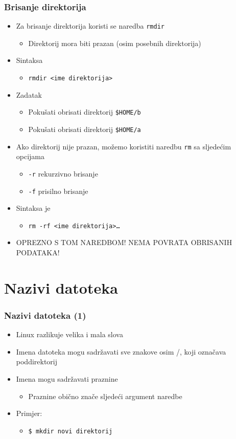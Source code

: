 \documentclass{beamer}
\begin{document}
\begin{frame}[t]
\frametitle{Brisanje direktorija}
\begin{itemize}
  \item Za brisanje direktorija koristi se naredba \texttt{rmdir}
  \begin{itemize}
    \item Direktorij mora biti prazan (osim posebnih direktorija)
  \end{itemize}
  \item Sintaksa
  \begin{itemize}
    \item[] \texttt{rmdir \textless ime direktorija\textgreater}
  \end{itemize}
  \item Zadatak
  \begin{itemize}
    \item Pokušati obrisati direktorij \texttt{\$HOME/b}
    \item Pokušati obrisati direktorij \texttt{\$HOME/a}
  \end{itemize}
   \item Ako direktorij nije prazan, možemo koristiti naredbu \texttt{rm}
        sa sljedećim opcijama
  \begin{itemize}
    \item \texttt{-r} rekurzivno brisanje
    \item \texttt{-f} prisilno brisanje
  \end{itemize}
  \item Sintaksa je
  \begin{itemize}
    \item[] \texttt{rm -rf \textless ime direktorija\textgreater\ldots}
  \end{itemize}
  \item[] OPREZNO S TOM NAREDBOM! NEMA POVRATA OBRISANIH PODATAKA!
\end{itemize}
\end{frame}


\section{Nazivi datoteka}
\begin{frame}[t]
\frametitle{Nazivi datoteka (1)}
\begin{itemize}
  \item Linux razlikuje velika i mala slova
  \item Imena datoteka mogu sadržavati sve znakove osim /, koji označava
        poddirektorij
  \item Imena mogu sadržavati praznine
  \begin{itemize}
    \item Praznine obično znače sljedeći argument naredbe
  \end{itemize}
  \item Primjer:
  \begin{itemize}
    \item[] \texttt{\$ mkdir novi direktorij}
  \end{itemize}
\end{itemize}
\end{frame}
\end{document}
